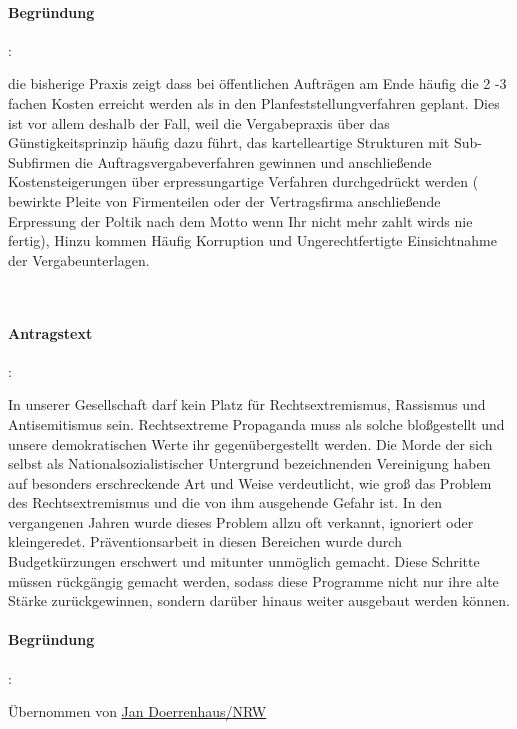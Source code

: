 \paragraph{Begründung}:

die bisherige Praxis zeigt dass bei öffentlichen Aufträgen am Ende häufig die 2 -3 fachen Kosten erreicht werden als in den Planfeststellungverfahren geplant. Dies ist vor allem deshalb der Fall, weil die Vergabepraxis über das Günstigkeitsprinzip häufig dazu führt, das kartelleartige Strukturen mit Sub-Subfirmen die Auftragsvergabeverfahren gewinnen und anschließende Kostensteigerungen über erpressungartige Verfahren durchgedrückt werden ( bewirkte Pleite von Firmenteilen oder der Vertragsfirma anschließende Erpressung der Poltik nach dem Motto {\Gu}wenn Ihr nicht mehr zahlt wirds nie fertig{\Go}), Hinzu kommen Häufig Korruption und Ungerechtfertigte Einsichtnahme der Vergabeunterlagen.


\\

\paragraph{Antragstext}:

In unserer Gesellschaft darf kein Platz für Rechtsextremismus, Rassismus und Antisemitismus sein. Rechtsextreme Propaganda muss als solche bloßgestellt und unsere demokratischen Werte ihr gegenübergestellt werden. Die Morde der sich selbst als {\Gu}Nationalsozialistischer Untergrund{\Go} bezeichnenden Vereinigung haben auf besonders erschreckende Art und Weise verdeutlicht, wie groß das Problem des Rechtsextremismus und die von ihm ausgehende Gefahr ist. In den vergangenen Jahren wurde dieses Problem allzu oft verkannt, ignoriert oder kleingeredet. Präventionsarbeit in diesen Bereichen wurde durch Budgetkürzungen erschwert und mitunter unmöglich gemacht. Diese Schritte müssen rückgängig gemacht werden, sodass diese Programme nicht nur ihre alte Stärke zurückgewinnen, sondern darüber hinaus weiter ausgebaut werden können.

\paragraph{Begründung}:

Übernommen von \href{http://jandoerrenhaus.de/2012/04/06/distanz.zu.rechts.punkt/}{Jan Doerrenhaus/NRW}

